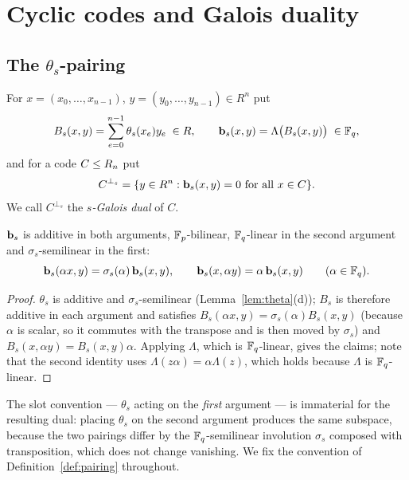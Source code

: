 \section{Cyclic codes and Galois duality}
\label{sec:cyclic}

\subsection{The \texorpdfstring{$\theta_s$}{theta\_s}-pairing}%
\label{subsec:pairing}

\begin{definition}\label{def:pairing}
For $x=(x_0,\dots,x_{n-1})$, $y=(y_0,\dots,y_{n-1})\in R^n$ put
\[
  B_s(x,y)=\sum_{e=0}^{n-1}\theta_s(x_e)y_e\;\in R,
  \qquad
  \mathbf b_s(x,y)=\Lambda\bigl(B_s(x,y)\bigr)\;\in\mathbb F_q ,
\]
and for a code $C\le R_n$ put
\[
  C^{\perp_s}=\{y\in R^n:\mathbf b_s(x,y)=0\ \text{for all }x\in C\}.
\]
We call $C^{\perp_s}$ the \emph{$s$-Galois dual} of $C$.
\end{definition}

\begin{lemma}[sesquilinearity]\label{lem:sesqui}
$\mathbf b_s$ is additive in both arguments, $\mathbb F_p$-bilinear,
$\mathbb F_q$-linear in the second argument and $\sigma_s$-semilinear in the first:
\[
  \mathbf b_s(\alpha x,y)=\sigma_s(\alpha)\,\mathbf b_s(x,y),\qquad
  \mathbf b_s(x,\alpha y)=\alpha\,\mathbf b_s(x,y)\qquad(\alpha\in\mathbb F_q).
\]
\end{lemma}

\begin{proof}
$\theta_s$ is additive and $\sigma_s$-semilinear
(Lemma~\ref{lem:theta}(d)); $B_s$ is therefore additive in each argument and
satisfies $B_s(\alpha x,y)=\sigma_s(\alpha)B_s(x,y)$ (because $\alpha$ is
scalar, so it commutes with the transpose and is then moved by $\sigma_s$) and
$B_s(x,\alpha y)=B_s(x,y)\alpha$. Applying $\Lambda$, which is $\mathbb F_q$-linear,
gives the claims; note that the second identity uses
$\Lambda(z\alpha)=\alpha\Lambda(z)$, which holds because $\Lambda$ is
$\mathbb F_q$-linear.
\end{proof}

The slot convention --- $\theta_s$ acting on the \emph{first} argument --- is
immaterial for the resulting dual: placing $\theta_s$ on the second argument
produces the same subspace, because the two pairings differ by the
$\mathbb F_q$-semilinear involution $\sigma_s$ composed with transposition, which does
not change vanishing. We fix the convention of
Definition~\ref{def:pairing} throughout.

